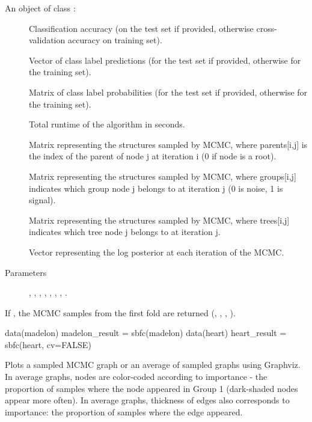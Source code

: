 \documentclass[a4paper]{book}
\begin{document}
%
\begin{Value}
An object of class :
\begin{description}
     
\item[] Classification accuracy (on the test set if provided, otherwise cross-validation accuracy on training set).
\item[] Vector of class label predictions (for the test set if provided, otherwise for the training set).
\item[] Matrix of class label probabilities (for the test set if provided, otherwise for the training set).
\item[] Total runtime of the algorithm in seconds.
\item[] Matrix representing the structures sampled by MCMC, where parents[i,j] is the index of the parent of node j at iteration i (0 if node is a root).
\item[] Matrix representing the structures sampled by MCMC, where groups[i,j] indicates which group node j belongs to at iteration j (0 is noise, 1 is signal).
\item[] Matrix representing the structures sampled by MCMC, where trees[i,j] indicates which tree node j belongs to at iteration j.
\item[] Vector representing the log posterior at each iteration of the MCMC.
\item[Parameters] , , , , , , , .

\end{description}

If , the MCMC samples from the first fold are returned (, , , ).
\end{Value}
%
\begin{Examples}
\begin{ExampleCode}
data(madelon)
madelon_result = sbfc(madelon)
data(heart)
heart_result = sbfc(heart, cv=FALSE)
\end{ExampleCode}
\end{Examples}
%
\begin{Description}\relax
Plots a sampled MCMC graph or an average of sampled graphs using Graphviz. \\{}
In average graphs, nodes are color-coded according to importance - the proportion of samples where the node appeared in Group 1 (dark-shaded nodes appear more often).
In average graphs, thickness of edges also corresponds to importance: the proportion of samples where the edge appeared.
\end{Description}
\end{document}

